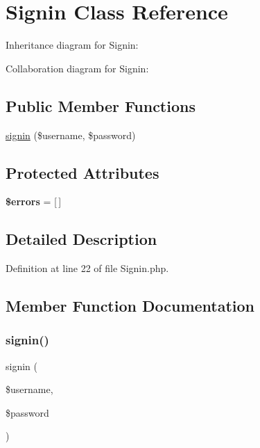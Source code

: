 \hypertarget{class_zest_1_1_auth_1_1_signin}{}\section{Signin Class Reference}
\label{class_zest_1_1_auth_1_1_signin}


Inheritance diagram for Signin\+:


Collaboration diagram for Signin\+:
\subsection*{Public Member Functions}
\begin{DoxyCompactItemize}
\item 
\mbox{\hyperlink{class_zest_1_1_auth_1_1_signin_a984c5d9a26fdfe5871fb70f76c801eb8}{signin}} (\$username, \$password)
\end{DoxyCompactItemize}
\subsection*{Protected Attributes}
\begin{DoxyCompactItemize}
\item 
\mbox{\label{class_zest_1_1_auth_1_1_signin_ab24faf4aa647cdcee494fc48524ad4ff}} 
{\bfseries \$errors} = \mbox{[}$\,$\mbox{]}
\end{DoxyCompactItemize}


\subsection{Detailed Description}


Definition at line 22 of file Signin.\+php.



\subsection{Member Function Documentation}
\mbox{\label{class_zest_1_1_auth_1_1_signin_a984c5d9a26fdfe5871fb70f76c801eb8}} 
\subsubsection{\texorpdfstring{signin()}{signin()}}
{\footnotesize\ttfamily signin (\begin{DoxyParamCaption}\item[{}]{\$username,  }\item[{}]{\$password }\end{DoxyParamCaption})}

